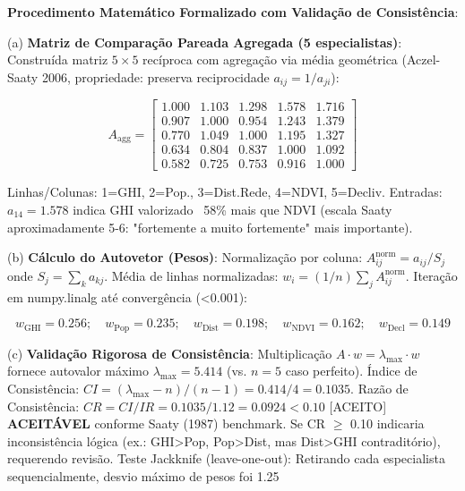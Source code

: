 \documentclass[12pt, a4paper]{article}
\begin{document}
\textbf{Procedimento Matemático Formalizado com Validação de Consistência}:

(a) \textbf{Matriz de Comparação Pareada Agregada (5 especialistas)}: Construída matriz $5 \times 5$ recíproca com agregação via média geométrica (Aczel-Saaty 2006, propriedade: preserva reciprocidade $a_{ij} = 1/a_{ji}$):

\begin{equation}
A_{\text{agg}} = \begin{bmatrix}
1.000 & 1.103 & 1.298 & 1.578 & 1.716 \\
0.907 & 1.000 & 0.954 & 1.243 & 1.379 \\
0.770 & 1.049 & 1.000 & 1.195 & 1.327 \\
0.634 & 0.804 & 0.837 & 1.000 & 1.092 \\
0.582 & 0.725 & 0.753 & 0.916 & 1.000
\end{bmatrix}
\end{equation}

Linhas/Colunas: 1=GHI, 2=Pop., 3=Dist.Rede, 4=NDVI, 5=Decliv. Entradas: $a_{14}=1.578$ indica GHI valorizado ~58\% mais que NDVI (escala Saaty aproximadamente 5-6: "fortemente a muito fortemente" mais importante).

(b) \textbf{Cálculo do Autovetor (Pesos)}: Normalização por coluna: $A^{\text{norm}}_{ij} = a_{ij}/S_j$ onde $S_j = \sum_k a_{kj}$. Média de linhas normalizadas: $w_i = (1/n) \sum_j A^{\text{norm}}_{ij}$. Iteração em numpy.linalg até convergência (<0.001):

\begin{equation}
w_{\text{GHI}} = 0.256; \quad w_{\text{Pop}} = 0.235; \quad w_{\text{Dist}} = 0.198; \quad w_{\text{NDVI}} = 0.162; \quad w_{\text{Decl}} = 0.149
\end{equation}

(c) 
\textbf{Validação Rigorosa de Consistência}: Multiplicação $A \cdot w = \lambda_{\max} \cdot w$ fornece autovalor máximo $\lambda_{\max} = 5.414$ (vs. $n=5$ caso perfeito). Índice de Consistência: $CI = (\lambda_{\max} - n)/(n-1) = 0.414/4 = 0.1035$. Razão de Consistência: $CR = CI/IR = 0.1035/1.12 = 0.0924 < 0.10$ [ACEITO] 
\textbf{ACEITÁVEL} conforme Saaty (1987) benchmark. Se CR $\geq$ 0.10 indicaria inconsistência lógica (ex.: GHI>Pop, Pop>Dist, mas Dist>GHI contraditório), requerendo revisão. Teste Jackknife (leave-one-out): Retirando cada especialista sequencialmente, desvio máximo de pesos foi 1.25%
\end{document}
